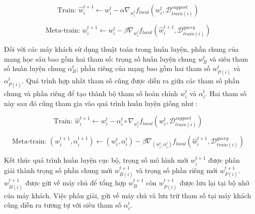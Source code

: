 \begin{dmath}
    \text{Train: } \hat{w}_{i}^{t+1} \gets w_{i}^t - \alpha\nabla_{w_i^t} f_{local}(w_{i}^t, \mathcal{D}_{train(i)}^{support})
\end{dmath}

\begin{dmath}
    \text{Meta-train: } w_{i}^{t+1} \gets w_{i}^t - \beta\nabla_{w_i^t} f_{local}(\hat{w}_{i}^{t+1}, \mathcal{D}_{train(i)}^{query})
\end{dmath}

Đối với các máy khách sử dụng thuật toán  trong huấn luyện, phần chung của mạng học sâu bao gồm hai tham số: trọng số huấn luyện chung $w_B^{t}$ và siêu tham số huấn luyện chung $\alpha_B^{t}$; phần riêng của mạng bao gồm hai tham số $w_{P(i)}^{t}$ và $\alpha_{P(i)}^{t}$. Quá trình hợp nhất tham số cũng được diễn ra giữa các tham số phần chung và phần riêng để tạo thành bộ tham số hoàn chỉnh $w_i^t$ và $\alpha_i^t$. Hai tham số này sau đó cũng tham gia vào quá trình huấn luyện giống như :

\begin{dmath}
    \text{Train: } \hat{w}_{i}^{t+1} \gets w_{i}^t - \alpha_i^t\circ\nabla_{w_i^t} f_{local}(w_{i}^t, \mathcal{D}_{train(i)}^{support})
\end{dmath}

\begin{dmath}
    \text{Meta-train: } (w_{i}^{t+1}, \alpha_i^{t+1}) \gets (w_{i}^t, \alpha_{i}^{t}) - \beta\nabla_{(w_i^t, \alpha_i^t)} f_{local}(\hat{w}_{i}^{t+1}, \mathcal{D}_{train(i)}^{query})
\end{dmath}

Kết thúc quá trình huấn luyện cục bộ, trọng số mô hình mới $w_i^{t+1}$ được phân giải thành trọng số phần chung mới $w_{B(i)}^{t+1}$ và trọng số phần riêng mới $w_{P(i)}^{t+1}$. $w_{B(i)}^{t+1}$ được gửi về máy chủ để tổng hợp $w_B^{t+1}$ còn $w_{P(i)}^{t+1}$ được lưu lại tại bộ nhớ của máy khách. Việc phân giải, gửi về máy chủ và lưu trữ tham số tại máy khách cũng diễn ra tương tự với siêu tham số $\alpha_i^t$.

